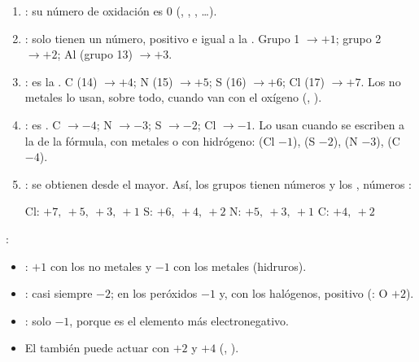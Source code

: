 \documentclass[12pt]{article}
\theoremstyle{mygreennumbox}
\begin{document}
\begin{enumerate}[label=\numberballblue]
    \item {}: su número de oxidación es \(0\) (, , , \dots).
    \item {}: solo tienen un número, positivo e igual a la . Grupo 1 \(\to +1\); grupo 2 \(\to +2\); Al (grupo 13) \(\to +3\).
    \item {}: es la . C (14) \(\to +4\); N (15) \(\to +5\); S (16) \(\to +6\); Cl (17) \(\to +7\). Los no metales lo usan, sobre todo, cuando van con el oxígeno (, ).
    \item {}: es . C \(\to -4\); N \(\to -3\); S \(\to -2\); Cl \(\to -1\). Lo usan cuando se escriben a la  de la fórmula, con metales o con hidrógeno:  (Cl \(-1\)),  (S \(-2\)),  (N \(-3\)),  (C \(-4\)).
    \item {}: se obtienen  desde el mayor. Así, los grupos  tienen números  y los , números :
          \begin{center}
              Cl: \(+7,\ +5,\ +3,\ +1\) \qquad S: \(+6,\ +4,\ +2\) \qquad N: \(+5,\ +3,\ +1\) \qquad C: \(+4,\ +2\)
          \end{center}
\end{enumerate}

\begin{marker}
    :
    \begin{itemize}
        \item {}: \(+1\) con los no metales y \(-1\) con los metales (hidruros).
        \item {}: casi siempre \(-2\); en los peróxidos \(-1\) y, con los halógenos, positivo (: O \(+2\)).
        \item {}: solo \(-1\), porque es el elemento más electronegativo.
        \item El  también puede actuar con \(+2\) y \(+4\) (, ).
    \end{itemize}
\end{marker}
\end{document}
